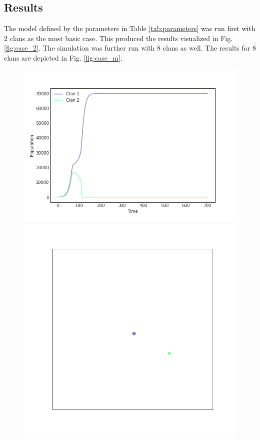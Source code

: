 \documentclass[letterpaper, 9pt, conference]{ieeeconf}  %
\begin{document}
\subsection{Results}
The model defined by the parameters in Table \ref{tab:parameters} was run first with $2$ clans as the most basic case. This produced the results visualized in Fig. \ref{fig:case_2}. The simulation was further run with $8$ clans as well. The results for $8$ clans are depicted in Fig. \ref{fig:case_m}.
\begin{figure}[!htb]
\begin{center}
  \includegraphics[width=\linewidth]{2clans_graph.png}
\endminipage\hfill
{}
  \includegraphics[width=\linewidth]{2clans_t0.png}

\end{center}
\end{figure}
\end{document}
